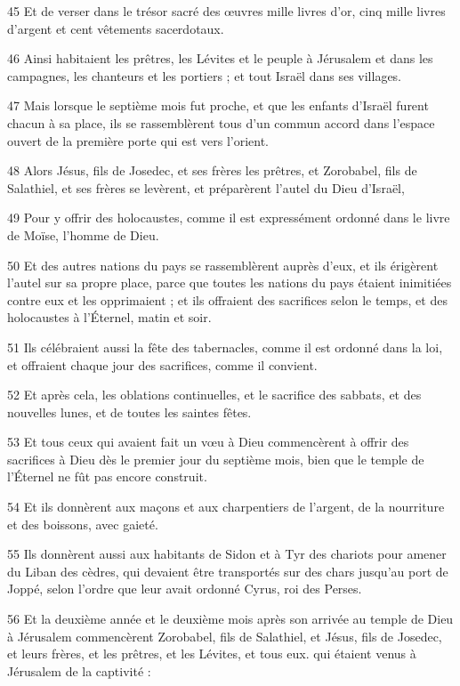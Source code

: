 \par 45 Et de verser dans le trésor sacré des œuvres mille livres d'or, cinq mille livres d'argent et cent vêtements sacerdotaux.
\par 46 Ainsi habitaient les prêtres, les Lévites et le peuple à Jérusalem et dans les campagnes, les chanteurs et les portiers ; et tout Israël dans ses villages.
\par 47 Mais lorsque le septième mois fut proche, et que les enfants d'Israël furent chacun à sa place, ils se rassemblèrent tous d'un commun accord dans l'espace ouvert de la première porte qui est vers l'orient.
\par 48 Alors Jésus, fils de Josedec, et ses frères les prêtres, et Zorobabel, fils de Salathiel, et ses frères se levèrent, et préparèrent l'autel du Dieu d'Israël,
\par 49 Pour y offrir des holocaustes, comme il est expressément ordonné dans le livre de Moïse, l'homme de Dieu.
\par 50 Et des autres nations du pays se rassemblèrent auprès d'eux, et ils érigèrent l'autel sur sa propre place, parce que toutes les nations du pays étaient inimitiées contre eux et les opprimaient ; et ils offraient des sacrifices selon le temps, et des holocaustes à l'Éternel, matin et soir.
\par 51 Ils célébraient aussi la fête des tabernacles, comme il est ordonné dans la loi, et offraient chaque jour des sacrifices, comme il convient.
\par 52 Et après cela, les oblations continuelles, et le sacrifice des sabbats, et des nouvelles lunes, et de toutes les saintes fêtes.
\par 53 Et tous ceux qui avaient fait un vœu à Dieu commencèrent à offrir des sacrifices à Dieu dès le premier jour du septième mois, bien que le temple de l'Éternel ne fût pas encore construit.
\par 54 Et ils donnèrent aux maçons et aux charpentiers de l'argent, de la nourriture et des boissons, avec gaieté.
\par 55 Ils donnèrent aussi aux habitants de Sidon et à Tyr des chariots pour amener du Liban des cèdres, qui devaient être transportés sur des chars jusqu'au port de Joppé, selon l'ordre que leur avait ordonné Cyrus, roi des Perses.
\par 56 Et la deuxième année et le deuxième mois après son arrivée au temple de Dieu à Jérusalem commencèrent Zorobabel, fils de Salathiel, et Jésus, fils de Josedec, et leurs frères, et les prêtres, et les Lévites, et tous eux. qui étaient venus à Jérusalem de la captivité :

